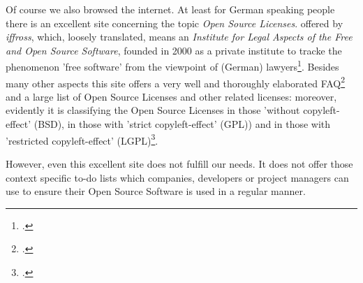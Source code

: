 %
%
%
%

%
Of course we also browsed the internet. At least for German speaking people
there is an excellent site concerning the topic \emph{Open Source Licenses}.
offered by \textit{iffross}, which, loosely translated, means an
\textit{Institute for Legal Aspects of the Free and Open Source
Software}, founded in 2000 as a private institute to
tracke the phenomenon 'free software' from the viewpoint of (German)
lawyers\footcite[cf.][\nopage wp]{ifross2011b}. Besides many other
aspects this site offers a very well and thoroughly elaborated
FAQ\footcite[cf.][\nopage wp]{ifross2011c} and a large list of Open
Source Licenses and other related licenses: moreover, evidently it is
classifying the Open Source Licenses in those 'without copyleft-effect' (BSD),
in those with 'strict copyleft-effect' (GPL)) and in those with 'restricted
copyleft-effect' (LGPL)\footcite[cf.][\nopage wp]{ifross2011a}.

However, even this excellent site does not fulfill our needs. It does not offer
those context specific to-do lists which companies, developers or project
managers can use to ensure their Open Source Software is used in a regular
manner.

